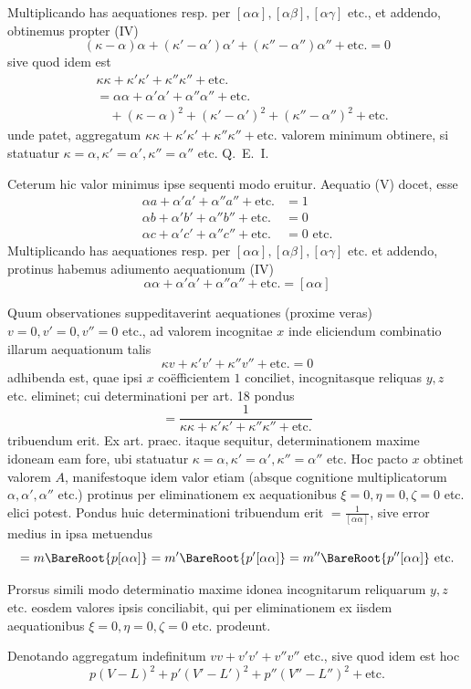 Multiplicando has aequationes resp. per \([\alpha\alpha],[\alpha\beta],[\alpha\gamma]\) etc., et addendo, obtinemus propter (IV)
\[
(\kappa-\alpha)\alpha+(\kappa'-\alpha')\alpha'+(\kappa''-\alpha'')\alpha''+\text{etc.}=0
\]
sive quod idem est
\[
\begin{aligned}
&\kappa\kappa+\kappa'\kappa'+\kappa''\kappa''+\text{etc.}\\
&=\alpha\alpha+\alpha'\alpha'+\alpha''\alpha''+\text{etc.}{}\\
&\quad+(\kappa-\alpha)^2+(\kappa'-\alpha')^2+(\kappa''-\alpha'')^2+\text{etc.}
\end{aligned}
\]
unde patet, aggregatum \(\kappa\kappa+\kappa'\kappa'+\kappa''\kappa''+\text{etc.}\) valorem minimum obtinere, si statuatur \(\kappa=\alpha,\kappa'=\alpha',\kappa''=\alpha''\) etc. Q.~E.~I.

Ceterum hic valor minimus ipse sequenti modo eruitur. Aequatio (V) docet, esse
\[
\begin{aligned}
\alpha a+\alpha'a'+\alpha''a''+\text{etc.}&=1\\
\alpha b+\alpha'b'+\alpha''b''+\text{etc.}&=0\\
\alpha c+\alpha'c'+\alpha''c''+\text{etc.}&=0\text{ etc.}
\end{aligned}
\]
Multiplicando has aequationes resp. per \([\alpha\alpha],[\alpha\beta],[\alpha\gamma]\) etc. et addendo, protinus habemus adiumento aequationum (IV)
\[
\alpha\alpha+\alpha'\alpha'+\alpha''\alpha''+\text{etc.}=[\alpha\alpha]
\]

Quum observationes suppeditaverint aequationes (proxime veras) \(v=0,v'=0,v''=0\) etc., ad valorem incognitae \(x\) inde eliciendum combinatio illarum aequationum talis
\[
\kappa v+\kappa'v'+\kappa''v''+\text{etc.}=0
\]
adhibenda est, quae ipsi \(x\) coëfficientem \(1\) conciliet, incognitasque reliquas \(y,z\) etc. eliminet; cui determinationi per art. 18 pondus
\[
=\frac1{\kappa\kappa+\kappa'\kappa'+\kappa''\kappa''+\text{etc.}}
\]
tribuendum erit. Ex art. praec. itaque sequitur, determinationem maxime idoneam eam fore, ubi statuatur \(\kappa=\alpha,\kappa'=\alpha',\kappa''=\alpha''\) etc. Hoc pacto \(x\) obtinet valorem \(A\), manifestoque idem valor etiam (absque cognitione multiplicatorum \(\alpha,\alpha',\alpha''\) etc.) protinus per eliminationem ex aequationibus \(\xi=0,\eta=0,\zeta=0\) etc. elici potest. Pondus huic determinationi tribuendum erit \(=\frac1{[\alpha\alpha]}\), sive error medius in ipsa metuendus
\[
=m\BareRoot{p[\alpha\alpha]}=m'\BareRoot{p'[\alpha\alpha]}=m''\BareRoot{p''[\alpha\alpha]}\text{ etc.}
\]

Prorsus simili modo determinatio maxime idonea incognitarum reliquarum \(y,z\) etc. eosdem valores ipsis conciliabit, qui per eliminationem ex iisdem aequationibus \(\xi=0,\eta=0,\zeta=0\) etc. prodeunt.

Denotando aggregatum indefinitum \(vv+v'v'+v''v''\text{ etc.}\), sive quod idem est hoc
\[
p(V-L)^2+p'(V'-L')^2+p''(V''-L'')^2+\text{etc.}
\]

